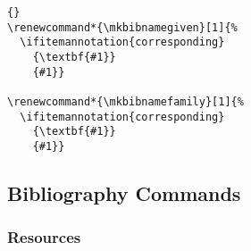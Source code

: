 \documentclass{ltxdockit}[2011/03/25]
\begin{document}
\begin{lstlisting}[style=latex]{}
\renewcommand*{\mkbibnamegiven}[1]{%
  \ifitemannotation{corresponding}
    {\textbf{#1}}
    {#1}}

\renewcommand*{\mkbibnamefamily}[1]{%
  \ifitemannotation{corresponding}
    {\textbf{#1}}
    {#1}}
\end{lstlisting}

\subsection{Bibliography Commands}
\label{use:bib}

\subsubsection{Resources}
\label{use:bib:res}
\end{document}
